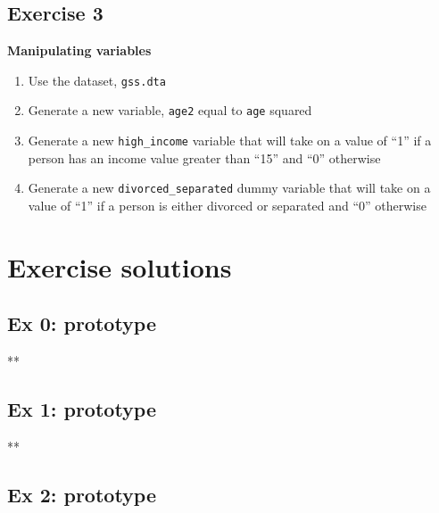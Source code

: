 \documentclass[
]{book}
\newenvironment{Shaded}{\begin{snugshade}}{\end{snugshade}}
\newcommand{\NormalTok}[1]{#1}
\providecommand{\tightlist}{%
  \setlength{\itemsep}{0pt}\setlength{\parskip}{0pt}}
\begin{document}
\hypertarget{exercise-3-4}{%
\subsection{Exercise 3}\label{exercise-3-4}}

\textbf{Manipulating variables}

\begin{enumerate}
\def\labelenumi{\arabic{enumi}.}
\tightlist
\item
  Use the dataset, \texttt{gss.dta}
\item
  Generate a new variable, \texttt{age2} equal to \texttt{age} squared
\item
  Generate a new \texttt{high\_income} variable that will take on a value of ``1'' if a person has an income value greater than ``15'' and ``0'' otherwise
\item
  Generate a new \texttt{divorced\_separated} dummy variable that will take on a value of ``1'' if a person is either divorced or separated and ``0'' otherwise
\end{enumerate}

\hypertarget{exercise-solutions-6}{%
\section{Exercise solutions}\label{exercise-solutions-6}}

\hypertarget{ex-0-prototype-6}{%
\subsection{Ex 0: prototype}\label{ex-0-prototype-6}}

\begin{Shaded}
\begin{Highlighting}[]
\NormalTok{**}
\end{Highlighting}
\end{Shaded}

\hypertarget{ex-1-prototype-6}{%
\subsection{Ex 1: prototype}\label{ex-1-prototype-6}}

\begin{Shaded}
\begin{Highlighting}[]
\NormalTok{**}
\end{Highlighting}
\end{Shaded}

\hypertarget{ex-2-prototype-4}{%
\subsection{Ex 2: prototype}\label{ex-2-prototype-4}}
\end{document}
